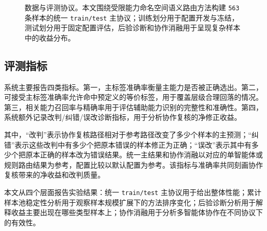 \documentclass[10pt,a4paper,twocolumn,fontset=fandol]{ctexart}
\begin{document}
\begin{figure}[htbp]
\centering
{}
\caption{数据与评测协议。本文围绕受限能力命名空间语义路由方法构建 \texttt{563} 条样本的统一 \texttt{train/test} 主协议；训练划分用于配置开发与冻结，测试划分用于固定配置评估，后验诊断和协作消融用于呈现复杂样本中的收益分布。}
\label{fig:protocol}
\end{figure}

\subsection{评测指标}

系统主要报告四类指标。第一，主标签准确率衡量主能力是否被正确选出。第二，可接受主标签准确率允许命中预定义的等价标签，用于覆盖层级合理回落的情况。第三，相关能力召回率与精确率用于评估辅助能力识别的完整性和准确性。第四，系统额外记录改判/纠错/误改诊断指标，用于分析协作复核的净修正收益。

其中，“改判”表示协作复核路径相对于参考路径改变了多少个样本的主预测；“纠错”表示这些改判中有多少个把原本错误的样本修正为正确；“误改”表示其中有多少个把原本正确的样本改为错误结果。统一主结果和协作消融以对应的单智能体或规则路由结果为参考，配置比较以默认配置为参考。该指标与准确率共同刻画协作复核带来的净收益和改判质量。

本文从四个层面报告实验结果：统一 \texttt{train/test} 主协议用于给出整体性能；累计样本池稳定性分析用于观察样本规模扩展下的方法排序变化；后验诊断分析用于解释收益主要出现在哪些类型样本上；协作消融用于分析多智能体协作在不同协议下的有效性。
\end{document}
